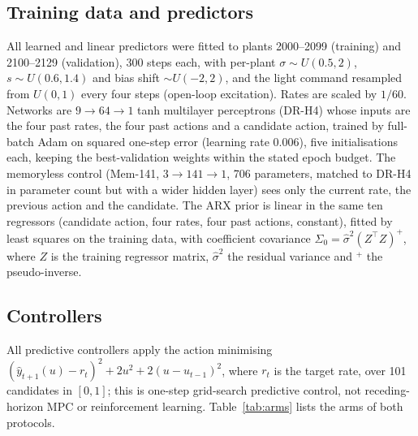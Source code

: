 \documentclass[11pt]{article}
\begin{document}
\subsection{Training data and predictors}
All learned and linear predictors were fitted to plants 2000--2099 (training) and 2100--2129 (validation), 300 steps each, with per-plant $\sigma\sim U(0.5,2)$, $s\sim U(0.6,1.4)$ and bias shift $\sim U(-2,2)$, and the light command resampled from $U(0,1)$ every four steps (open-loop excitation). Rates are scaled by $1/60$. Networks are $9\to64\to1$ tanh multilayer perceptrons (DR-H4) whose inputs are the four past rates, the four past actions and a candidate action, trained by full-batch Adam on squared one-step error (learning rate 0.006), five initialisations each, keeping the best-validation weights within the stated epoch budget. The memoryless control (Mem-141, $3\to141\to1$, 706 parameters, matched to DR-H4 in parameter count but with a wider hidden layer) sees only the current rate, the previous action and the candidate. The ARX prior is linear in the same ten regressors (candidate action, four rates, four past actions, constant), fitted by least squares on the training data, with coefficient covariance $\Sigma_0=\hat\sigma^2(Z^\top Z)^{+}$, where $Z$ is the training regressor matrix, $\hat\sigma^2$ the residual variance and $^{+}$ the pseudo-inverse.

\subsection{Controllers}
All predictive controllers apply the action minimising $(\hat y_{t+1}(u)-r_t)^2+2u^2+2(u-u_{t-1})^2$, where $r_t$ is the target rate, over 101 candidates in $[0,1]$; this is one-step grid-search predictive control, not receding-horizon MPC or reinforcement learning. Table~\ref{tab:arms} lists the arms of both protocols.
\end{document}
